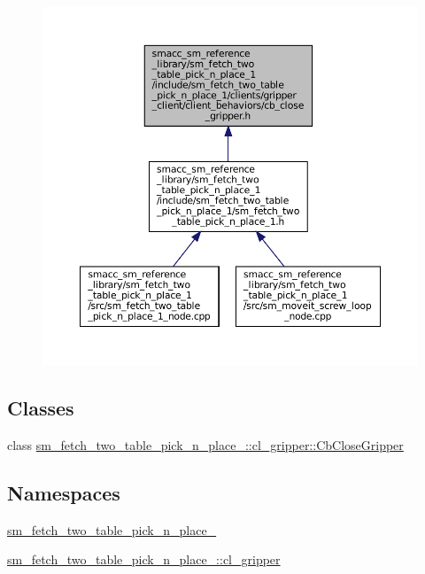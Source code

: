 \nopagebreak
\begin{figure}[H]
\begin{center}
\leavevmode
\includegraphics[width=350pt]{sm__fetch__two__table__pick__n__place__1_2include_2sm__fetch__two__table__pick__n__place__1_2cli976374be83939c2baff3543695d56e2c}
\end{center}
\end{figure}
\subsection*{Classes}
\begin{DoxyCompactItemize}
\item 
class \hyperlink{classsm__fetch__two__table__pick__n__place__1_1_1cl__gripper_1_1CbCloseGripper}{sm\+\_\+fetch\+\_\+two\+\_\+table\+\_\+pick\+\_\+n\+\_\+place\+\_\+::cl\+\_\+gripper\+::\+Cb\+Close\+Gripper}
\end{DoxyCompactItemize}
\subsection*{Namespaces}
\begin{DoxyCompactItemize}
\item 
 \hyperlink{namespacesm__fetch__two__table__pick__n__place__1}{sm\+\_\+fetch\+\_\+two\+\_\+table\+\_\+pick\+\_\+n\+\_\+place\+\_}
\item 
 \hyperlink{namespacesm__fetch__two__table__pick__n__place__1_1_1cl__gripper}{sm\+\_\+fetch\+\_\+two\+\_\+table\+\_\+pick\+\_\+n\+\_\+place\+\_\+::cl\+\_\+gripper}
\end{DoxyCompactItemize}
